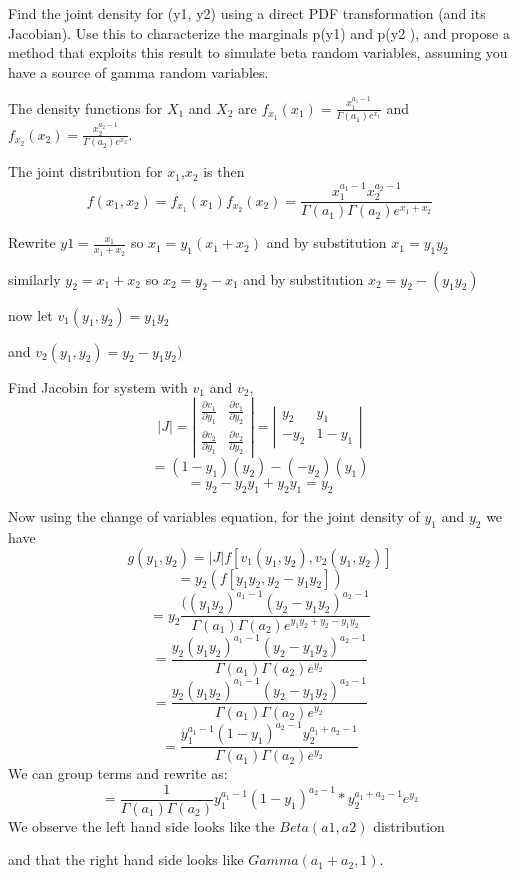\documentclass{homework}
\begin{document}
\begin{enumerate}[label=(\Alph*)]
\par Find the joint density for (y1, y2) using a direct PDF transformation (and its Jacobian). Use this to characterize the marginals p(y1) and p(y2 ), and propose a method that exploits this result to simulate beta random variables, assuming you have a source of gamma random variables.
\setlength{\parindent}{5ex} 
\par The density functions for $X_1$ and $X_2$ are $f_{x_1}(x_1) = \frac{ x_1^{a_1 - 1}}{\Gamma(a_1)e^{x_1}}$ and $f_{x_2}(x_2) = \frac{ x_2^{a_2 - 1}}{\Gamma(a_2)e^{x_2}}$.  
\par The joint distribution for $x_1$,$x_2$ is then $$f(x_1,x_2) = f_{x_1}(x_1)f_{x_2}(x_2) = \frac{x_1^{a_1 - 1}x_2^{a_2 - 1} }{ \Gamma(a_1)\Gamma(a_2)e^{x_1 + x_2}}$$
\par Rewrite $y1 = \frac{x_1}{x_1 + x_2}$ so $x_1 = y_1(x_1 + x_2)$ and by substitution $x_1 = y_1y_2$
\par similarly $y_2 = x_1 + x_2$ so $x_2 = y_2 - x_1$ and by substitution $x_2 = y_2 - (y_1y_2)$
\par now let $v_1(y_1,y_2) = y_1y_2$  \par and $v_2(y_1,y_2) = y_2 - y_1y_2)$
\par Find Jacobin for system with $v_1$ and $v_2$, $$| J | = 
| \begin{matrix} \frac{\partial v_1}{\partial y_1} & \frac{\partial v_1}{\partial y_2} \\ \frac{\partial v_2}{\partial y_1} & \frac{\partial v_2}{\partial y_2}\end{matrix} | = | \begin{matrix} y_2 & y_1 \\ -y_2 & 1 - y_1 \end{matrix}| $$ $$= (1 - y_1)(y_2) - ( -y_2)(y_1) $$ $$= y_2 - y_2y_1 + y_2y_1 = y_2$$
\par Now using the change of variables equation, for the joint density of $y_1$ and $y_2$ we have 
$$g(y_1, y_2) = | J | f[ v_1(y_1,y_2), v_2(y_1,y_2) ]$$ 
$$ = y_2( f[ y_1y_2, y_2 - y_1y_2 ] ) $$ 
$$ = y_2 \frac{( (y_1y_2)^{a_1 - 1}( y_2 - y_1y_2)^{a_2 - 1}}{ \Gamma(a_1) \Gamma(a_2) e^{y_1y_2 + y_2 - y_1y_2}}$$
$$ = \frac{y_2 (y_1y_2)^{a_1 - 1}( y_2 - y_1y_2)^{a_2 - 1}}{ \Gamma(a_1) \Gamma(a_2) e^{y_2}}$$
$$ = \frac{y_2 (y_1y_2)^{a_1 - 1}( y_2 - y_1y_2)^{a_2 - 1}}{ \Gamma(a_1) \Gamma(a_2) e^{y_2}}$$
$$ = \frac{y_1^{a_1 - 1}(1 - y_1)^{a_2 - 1} y_2^{a_1 + a_2 - 1}}{  \Gamma(a_1) \Gamma(a_2) e^{y_2} }$$
We can group terms and rewrite as:
$$ = \frac{1}{  \Gamma(a_1) \Gamma(a_2)  }y_1^{a_1 - 1}(1 - y_1)^{a_2 - 1} *  y_2^{a_1 + a_2 - 1}e^{y_2}$$
We observe the left hand side looks like the $Beta(a1,a2)$ distribution \par and that the right hand side looks like $Gamma(a_1 + a_2, 1)$.


\end{enumerate}
\end{document}
